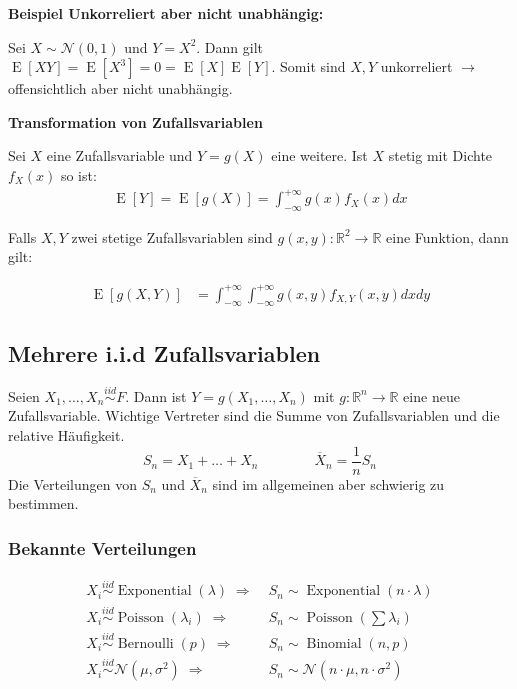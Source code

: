 \documentclass[25pt]{sciposter}
\newcommand{\R}{\mathbb{R}}
\newcommand{\E}{\operatorname{E}}
\newcommand{\mc}{\mathcal}
\newenvironment{thm}[1]{\begin{mdframed}[backgroundcolor=pink!20,innertopmargin=15pt, innerbottommargin=15pt, nobreak=true]
		\textbf{#1 }
	}
	{ 
	\end{mdframed}
}
\begin{document}
\begin{multicols}{3}
		\textbf{Beispiel Unkorreliert aber nicht unabhängig:}
		
		Sei $X\sim \mathcal{N}(0,1)$ und $Y = X^2$. Dann gilt $\E[XY] = \E[X^3] = 0 = \E[X]\E[Y]$. Somit sind $X,Y$ unkorreliert $\rightarrow$ offensichtlich aber nicht unabhängig.
		
		
		
		
		
		\begin{thm}{Transformation von Zufallsvariablen}
			Sei $X$ eine Zufallsvariable und $Y=g(X)$ eine weitere. Ist $X$ stetig mit Dichte $f_X(x)$ so ist:
			\begin{align*}
				\E[Y] = \E[g(X)] = \int_{-\infty}^{+\infty} g(x) f_X(x) dx
			\end{align*}
			
			Falls $X,Y$ zwei stetige Zufallsvariablen sind $g(x,y) : \R^2 \to \R$ eine Funktion, dann gilt:
			
			\begin{align*}
				\E[g(X,Y)] &= \int_{-\infty}^{+\infty} \int_{-\infty}^{+\infty} g(x,y) f_{X,Y}(x,y) dx dy
			\end{align*}
			
		\end{thm}
		
		
		
		
		\subsection*{Mehrere i.i.d Zufallsvariablen}
		
		Seien $X_1,\ldots,X_n \overset{iid}{\sim} F$. Dann ist $Y=g(X_1,\ldots,X_n)$ mit $g: \R^n \longrightarrow \R$ eine neue Zufallsvariable.
		Wichtige Vertreter sind die Summe von Zufallsvariablen und die relative Häufigkeit.
		\[ S_n = X_1 + \ldots + X_n \qquad \qquad\overline{X}_n = \dfrac{1}{n} S_n \]
		Die Verteilungen von $S_n$ und $\overline X_n$ sind im allgemeinen aber schwierig zu bestimmen.
		
		\subsubsection*{Bekannte Verteilungen}
		\begin{align*}
			X_i \overset{iid}{\sim} \operatorname{Exponential}(\lambda) \; \Rightarrow & \; S_n \sim \operatorname{Exponential}(n\cdot \lambda) \\
			X_i \overset{iid}{\sim} \operatorname{Poisson}(\lambda_i) \; \Rightarrow & \; S_n \sim \operatorname{Poisson}({\textstyle \sum \lambda_i}) \\
			X_i \overset{iid}{\sim} \operatorname{Bernoulli}(p) \; \Rightarrow & \; S_n \sim \operatorname{Binomial}(n,p)\\
			X_i \overset{iid}{\sim} \mc N(\mu, \sigma^2) \; \Rightarrow & \; S_n \sim \mc N(n \cdot \mu, n \cdot \sigma^2)
		\end{align*}

\end{multicols}
\end{document}
